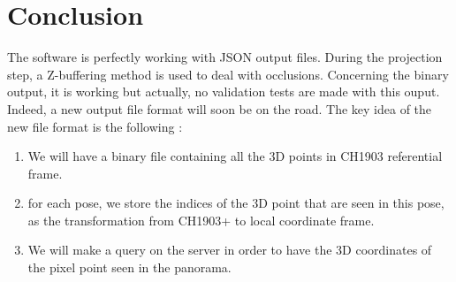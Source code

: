 \documentclass[a4paper, 11pt]{article}
\begin{document}
\section*{Conclusion}
  The software is perfectly working with JSON output files. During the projection step, a Z-buffering method is used to
  deal with occlusions. Concerning the binary output, it is working but actually, no
  validation tests are made with this ouput. Indeed, a new output file format will soon be on the road. The key idea of the
  new file format is the following :
  \begin{enumerate}
      \item We will have a binary file containing all the 3D points in CH1903 referential frame.
      \item for each pose, we store the indices of the 3D point that are seen in this pose, as the transformation
            from CH1903+ to local coordinate frame.
      \item We will make a query on the server in order to have the 3D coordinates of the pixel point seen in the panorama.
  \end{enumerate}
\end{document}
